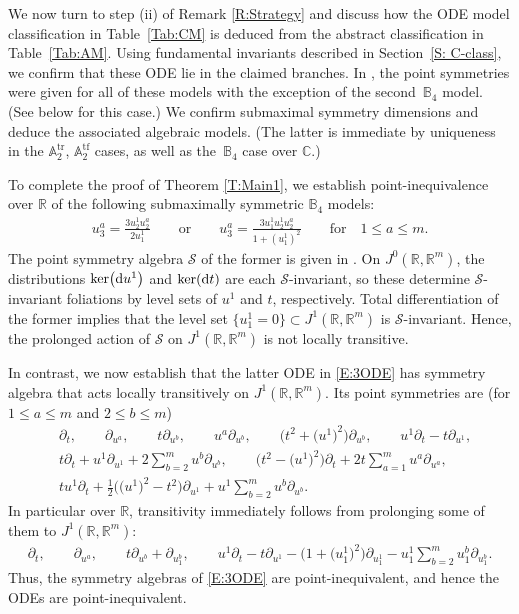 \documentclass[pdftex]{sigma}%
\newcommand\cS{\mathcal{S}}
\DeclareMathOperator{\tf}{tf}
\DeclareMathOperator{\tr}{tr}
\newcommand{\R}{\mathbb{R}}
\newcommand{\C}{\mathbb{C}}
\newcommand\bbA{\mathbb{A}}
\newcommand\bbB{\mathbb{B}}
\numberwithin{equation}{section}
\begin{document}
 We now turn to step (ii) of Remark \ref{R:Strategy} and discuss how the ODE model classification in Table~\ref{Tab:CM} is deduced from the abstract classification in Table~\ref{Tab:AM}. Using fundamental invariants described in Section~\ref{S: C-class}, we confirm that these ODE lie in the claimed branches. In \cite[Table~10]{KT2021}, the point symmetries were given for all of these models with the exception of the second~$\bbB_4$ model. (See below for this case.) We confirm submaximal symmetry dimensions and deduce the associated algebraic models. (The latter is immediate by uniqueness in the $\bbA_2^{\tr}$, $\bbA_2^{\tf}$ cases, as well as the~$\bbB_4$ case over $\C$.)

To complete the proof of Theorem \ref{T:Main1}, we establish point-inequivalence over $\R$ of the following submaximally symmetric $\bbB_4$ models:
\begin{align}\label{E:3ODE}
u_3^a= \frac{3u_2^1 u_2^a}{2u^1_1} \qquad \text{or} \qquad u_3^a= \frac{3u_1^1u_2^1 u_2^a}{1 + (u^1_1)^2} \qquad \text{for}\quad 1 \leq a \leq m.
\end{align}
The point symmetry algebra $\cS$ of the former is given in \cite[Table 10]{KT2021}. On $J^0(\R,\R^m)$, the distributions $\ker\bigl({\rm d}u^1\bigr)$ and $\ker({\rm d}t)$ are each $\cS$-invariant, so these determine $\cS$-invariant foliations by level sets of $u^1$ and $t$, respectively. Total differentiation of the former implies that the level set $\bigl\{u_1^1=0\bigr\} \subset J^1(\R,\R^m)$ is $\cS$-invariant. Hence, the prolonged action of $\cS$ on $J^1(\R,\R^m)$ is not locally transitive.

In contrast, we now establish that the latter ODE in \eqref{E:3ODE} has symmetry algebra that acts locally transitively on $J^1(\R,\R^m)$. Its point symmetries are (for $1 \le a \le m$ and $2 \le b \le m$)
\begin{align*}%
&\partial_t, \qquad \partial_{u^a}, \qquad t \partial_{u^b}, \qquad u^a\partial_{u^b}, \qquad \bigl(t^2 + \bigl(u^1\bigr)^2\bigr)\partial_{u^b}, \qquad u^1\partial_t -t\partial_{u^1}, \\
& t\partial_t + u^1\partial_{u^1} + 2 \sum_{b=2}^m u^b\partial_{u^b}, \qquad \bigl(t^2-\bigl(u^1\bigr)^2\bigr)\partial_t + 2t\sum_{a=1}^m u^a \partial_{u^a}, \\
& tu^1\partial_t + \frac{1}{2}\bigl(\bigl(u^1\bigr)^2-t^2\bigr)\partial_{u^1} + u^1\sum_{b=2}^m u^b\partial_{u^b}.
\end{align*}
In particular over $\R$, transitivity immediately follows from prolonging some of them to $J^1(\R,\R^m\!)$:
\begin{align*}
 \partial_t, \qquad
 \partial_{u^a}, \qquad
 t\partial_{u^b} + \partial_{u^b_1}, \qquad
 u^1\partial_t - t\partial_{u^1} - \bigl(1 + \bigl(u^1_1\bigr)^2\bigr) \partial_{u^1_1} - u^1_1 \sum_{b=2}^m u^b_1 \partial_{u^b_1}.
\end{align*}
Thus, the symmetry algebras of \eqref{E:3ODE} are point-inequivalent, and hence the ODEs are point-inequivalent.
\end{document}
